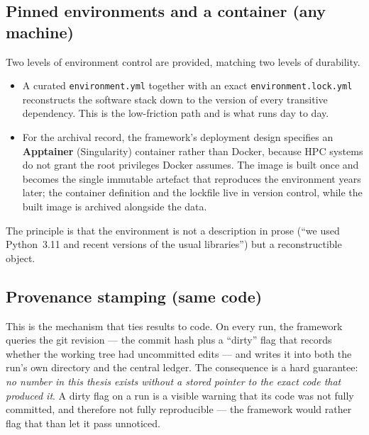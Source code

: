 \documentclass[11pt,a4paper]{article}
\newcommand{\code}[1]{\texttt{#1}}
\begin{document}
\subsection{Pinned environments and a container (any machine)}
Two levels of environment control are provided, matching two levels of durability.
\begin{itemize}[leftmargin=1.6em]
  \item A curated \code{environment.yml} together with an exact \code{environment.lock.yml}
    reconstructs the software stack down to the version of every transitive dependency. This is
    the low-friction path and is what runs day to day.
  \item For the archival record, the framework's deployment design specifies an
    \textbf{Apptainer} (Singularity) container rather than Docker, because HPC systems do not
    grant the root privileges Docker assumes. The image is built once and becomes the single
    immutable artefact that reproduces the environment years later; the container definition and
    the lockfile live in version control, while the built image is archived alongside the data.
\end{itemize}
The principle is that the environment is not a description in prose (``we used Python~3.11 and
recent versions of the usual libraries'') but a reconstructible object.

\subsection{Provenance stamping (same code)}
This is the mechanism that ties results to code. On every run, the framework queries the git
revision --- the commit hash plus a ``dirty'' flag that records whether the working tree had
uncommitted edits --- and writes it into both the run's own directory and the central ledger.
The consequence is a hard guarantee: \emph{no number in this thesis exists without a stored
pointer to the exact code that produced it}. A dirty flag on a run is a visible warning that its
code was not fully committed, and therefore not fully reproducible --- the framework would rather
flag that than let it pass unnoticed.
\end{document}
